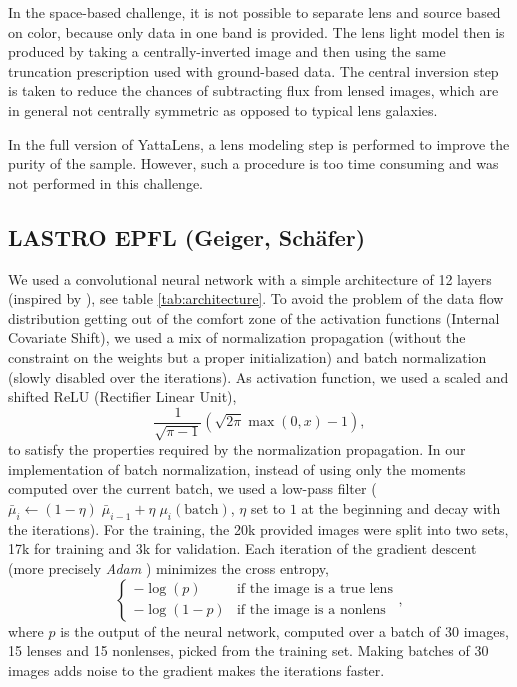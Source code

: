 \documentclass[useAMS,usenatbib]{mnras}
\begin{document}
In the space-based challenge, it is not possible to separate lens and source based on color, because only data in one band is provided. The lens light model then is produced by taking a centrally-inverted image and then using the same truncation prescription used with ground-based data. The central inversion step is taken to reduce the chances of subtracting flux from lensed images, which are in general not centrally symmetric as opposed to typical lens galaxies.

In the full version of YattaLens, a lens modeling step is performed to improve the purity of the sample. However, such a procedure is too time consuming and was not performed in this challenge.


\subsection{LASTRO EPFL (Geiger, Sch\"{a}fer)}

We used a convolutional neural network \citep{Fukushima1980,Lecun1998} with a simple architecture of 12 layers (inspired by \citep{symmetry}), see table \ref{tab:architecture}.
To avoid the problem of the data flow distribution getting out of the comfort zone of the activation functions (Internal Covariate Shift), we used a mix of normalization propagation \citep{norm_prop} (without the constraint on the weights but a proper initialization) and batch normalization \citep{batch_norm} (slowly disabled over the iterations).
As activation function, we used a scaled and shifted ReLU (Rectifier Linear Unit), 
\begin{equation} \label{eq:relu}
    \frac{1}{\sqrt{\pi-1}} (\sqrt{2 \pi} \max(0,x) - 1),
\end{equation}
to satisfy the properties required by the normalization propagation.
In our implementation of batch normalization, instead of using only the moments computed over the current batch, we used a low-pass filter ($\bar\mu_i \longleftarrow (1-\eta) \; \bar\mu_{i-1} + \eta \; \mu_i(\text{batch})$, $\eta$ set to $1$ at the beginning and decay with the iterations).
For the training, the 20k provided images were split into two sets, 17k for training and 3k for validation.
Each iteration of the gradient descent (more precisely \textit{Adam} \citep{adam}) minimizes the cross entropy, 
\begin{equation} \label{eq:xent}
    \left\{
    \begin{array}{ll}
        - \log(p)   & \text{if the image is a true lens} \\
        - \log(1-p) & \text{if the image is a nonlens}
    \end{array}
    \right.,
\end{equation}
where $p$ is the output of the neural network, computed over a batch of 30 images, 15 lenses and 15 nonlenses, picked from the training set.
Making batches of 30 images adds noise to the gradient makes the iterations faster.
\end{document}
